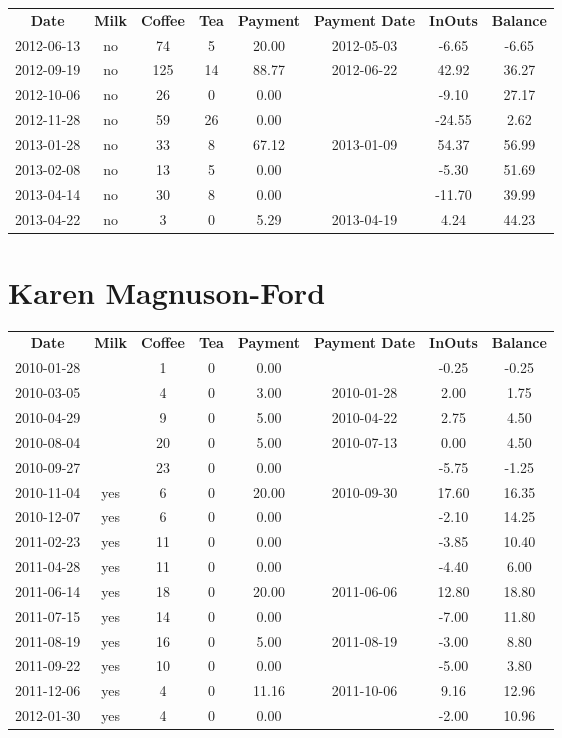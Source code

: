 \begin{center}
\begin{tabular}{cccccccc}
\textbf{Date} & \textbf{Milk} & \textbf{Coffee} & \textbf{Tea} & \textbf{Payment} & \textbf{Payment Date} & \textbf{InOuts} & \textbf{Balance} \\
2012-06-13 & no &  74 &  5 & 20.00 & 2012-05-03 &  -6.65 & -6.65\\ 
2012-09-19 & no & 125 & 14 & 88.77 & 2012-06-22 &  42.92 & 36.27\\ 
2012-10-06 & no &  26 &  0 &  0.00 &  &  -9.10 & 27.17\\ 
2012-11-28 & no &  59 & 26 &  0.00 &  & -24.55 &  2.62\\ 
2013-01-28 & no &  33 &  8 & 67.12 & 2013-01-09 &  54.37 & 56.99\\ 
2013-02-08 & no &  13 &  5 &  0.00 &  &  -5.30 & 51.69\\ 
2013-04-14 & no &  30 &  8 &  0.00 &  & -11.70 & 39.99\\ 
2013-04-22 & no &   3 &  0 &  5.29 & 2013-04-19 &   4.24 & 44.23
\end{tabular}
\end{center}

\section{Karen Magnuson-Ford}

\begin{center}
\begin{tabular}{cccccccc}
\textbf{Date} & \textbf{Milk} & \textbf{Coffee} & \textbf{Tea} & \textbf{Payment} & \textbf{Payment Date} & \textbf{InOuts} & \textbf{Balance} \\
2010-01-28 &  &  1 & 0 &  0.00 &  & -0.25 & -0.25\\ 
2010-03-05 &  &  4 & 0 &  3.00 & 2010-01-28 &  2.00 &  1.75\\ 
2010-04-29 &  &  9 & 0 &  5.00 & 2010-04-22 &  2.75 &  4.50\\ 
2010-08-04 &  & 20 & 0 &  5.00 & 2010-07-13 &  0.00 &  4.50\\ 
2010-09-27 &  & 23 & 0 &  0.00 &  & -5.75 & -1.25\\ 
2010-11-04 & yes &  6 & 0 & 20.00 & 2010-09-30 & 17.60 & 16.35\\ 
2010-12-07 & yes &  6 & 0 &  0.00 &  & -2.10 & 14.25\\ 
2011-02-23 & yes & 11 & 0 &  0.00 &  & -3.85 & 10.40\\ 
2011-04-28 & yes & 11 & 0 &  0.00 &  & -4.40 &  6.00\\ 
2011-06-14 & yes & 18 & 0 & 20.00 & 2011-06-06 & 12.80 & 18.80\\ 
2011-07-15 & yes & 14 & 0 &  0.00 &  & -7.00 & 11.80\\ 
2011-08-19 & yes & 16 & 0 &  5.00 & 2011-08-19 & -3.00 &  8.80\\ 
2011-09-22 & yes & 10 & 0 &  0.00 &  & -5.00 &  3.80\\ 
2011-12-06 & yes &  4 & 0 & 11.16 & 2011-10-06 &  9.16 & 12.96\\ 
2012-01-30 & yes &  4 & 0 &  0.00 &  & -2.00 & 10.96
\end{tabular}
\end{center}

